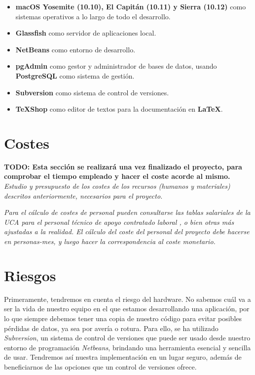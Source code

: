 \begin{itemize}
\item \textbf{macOS Yosemite (10.10), El Capitán (10.11) y Sierra (10.12)} como sistemas operativos a lo largo de todo el desarrollo.
\item \textbf{Glassfish} como servidor de aplicaciones local.
\item \textbf{NetBeans} como entorno de desarrollo.
\item \textbf{pgAdmin} como gestor y administrador de bases de datos, usando \textbf{PostgreSQL} como sistema de gestión.
\item \textbf{Subversion} como sistema de control de versiones.
\item \textbf{TeXShop} como editor de textos para la documentación en \textbf{LaTeX}.
\end{itemize}


\section{Costes}

\textbf{TODO: Esta sección se realizará una vez finalizado el proyecto, para comprobar el tiempo empleado y hacer el coste acorde al mismo.}
\\

\textit{Estudio y presupuesto de los costes de los recursos (humanos y materiales) descritos anteriormente, necesarios para el proyecto.}

\textit{Para el cálculo de costes de personal pueden consultarse las tablas salariales de la UCA para el personal técnico de apoyo contratado laboral \cite{paslaboral}, o bien otras más ajustadas a la realidad. El cálculo del coste del personal del proyecto debe hacerse en personas-mes, y luego hacer la correspondencia al coste monetario.}


\section{Riesgos}

Primeramente, tendremos en cuenta el riesgo del hardware. No sabemos cuál va a ser la vida de nuestro equipo en el que estamos desarrollando una aplicación, por lo que siempre debemos tener una copia de nuestro código para evitar posibles pérdidas de datos, ya sea por avería o rotura. Para ello, se ha utilizado \textit{Subversion}, un sistema de control de versiones que puede ser usado desde nuestro entorno de programación \textit{Netbeans}, brindando una herramienta esencial y sencilla de usar. Tendremos así nuestra implementación en un lugar seguro, además de beneficiarnos de las opciones que un control de versiones ofrece.
\\

